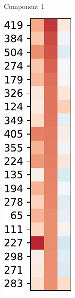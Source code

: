 \begin{figure}[h]
\begin{subfigure}[b]{0.3\textwidth}
        \caption{Component 1}
    \end{subfigure}
    \hfill
    \begin{subfigure}[b]{0.3\textwidth}
        \centering
        \includegraphics[width=\textwidth]{figs/varimax-magnatagatune-1.pdf}

\end{subfigure}
\end{figure}
